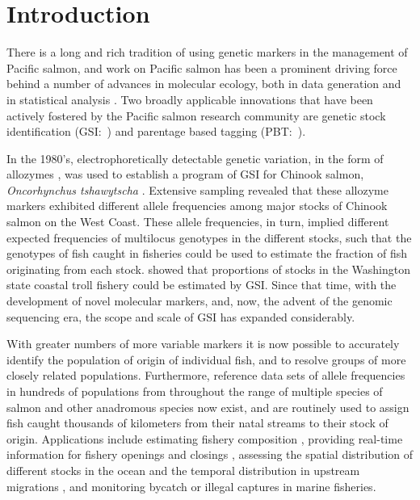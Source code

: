 
\section*{Introduction}

There is a long and rich tradition of using genetic markers in the 
management of Pacific salmon, and work on Pacific salmon has been
a prominent driving force behind a number of advances in molecular ecology,
both in data generation \citep{clemento2011discovery,campbell2015genotyping,mckinney2017managing}
and in statistical analysis
\citep{smouse1990genetic,anderson2002model,pella2006gibbs}.
Two broadly applicable innovations that have been
actively fostered by the Pacific salmon research community are genetic
stock identification
(GSI:~\citealt{milner1982genetic,beacham2004dna,seeb2007development}) and parentage based tagging
(PBT:~\citealt{anderson2006power, garza2007large, abadia2013large, steele2013validation}).  


 In the 1980's, electrophoretically
detectable genetic variation, in the form of allozymes
\citep{ayala1972allozymes,allendorf1981use}, was used to
establish a program of GSI for Chinook salmon,
{\em Oncorhynchus tshawytscha} \citep{milner1982genetic}.  Extensive sampling
revealed that these allozyme markers
exhibited different allele frequencies among major stocks of Chinook salmon on the West Coast.  These allele frequencies, in turn, implied different expected frequencies of 
multilocus genotypes in the different stocks, such that the genotypes of fish caught in fisheries 
could be used to estimate the fraction of fish originating from each stock.
\citet{milner1985genetic} showed that proportions of stocks in
the Washington state coastal troll fishery could be estimated by GSI.
Since that time, with the development of novel molecular markers,
and, now, the advent of the genomic sequencing era, the scope and scale of GSI
has expanded considerably.

With greater numbers of more variable markers it is now possible to accurately
identify the population of origin of individual fish, and to resolve groups of
more closely related populations.  Furthermore, reference data sets of allele 
frequencies in hundreds of populations from throughout the range of multiple species of salmon and
other anadromous species
\citep{seeb2007development,gilbey2018microsatellite,barclay2019genetic} now exist, and are routinely used to assign fish caught thousands of
kilometers from their natal streams to their stock of origin. Applications include estimating fishery
composition \citep{satterthwaite2015stock}, providing real-time information for fishery openings and closings \citep{beacham2004dna}, assessing the spatial distribution of different stocks in the
ocean \citep{urawa2009stock} and the temporal distribution in upstream migrations
\citep{hess2014monitoring},  and monitoring  bycatch \citep{hasselman2016genetic} or illegal captures \citep{wilmot1999origins} in marine fisheries.


